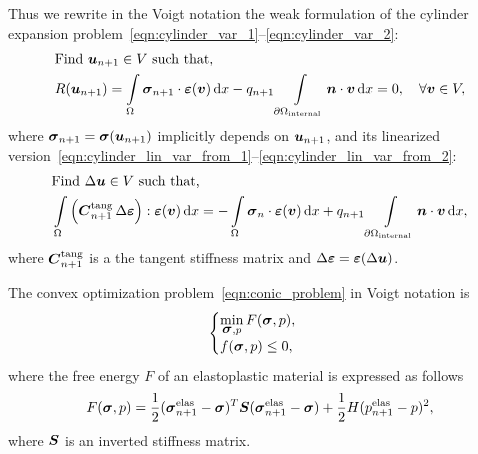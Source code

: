 \documentclass[12pt]{article}
\begin{document}
Thus we rewrite in the Voigt notation the weak formulation of the cylinder expansion problem~\ref{eqn:cylinder_var_1}--\ref{eqn:cylinder_var_2}:
\begin{align}
    & \text{Find } \mbox{\boldmath $u$}_{n+1} \in V \text{ such that,} \label{eqn:var_disc_from_1_voigt} \\ 
    & R(\mbox{\boldmath $u$}_{n+1}) = \int\limits_\Omega\mbox{\boldmath$\sigma$}_{n+1} \cdot \mbox{\boldmath $\varepsilon$}(\mbox{\boldmath $v$}) \, \mathrm{d} x - q_{n+1}\int\limits_{\partial\Omega_\text{internal}}\mbox{\boldmath $n$} \cdot \mbox{\boldmath $v$} \, \mathrm{d} x = 0, \quad \forall \mbox{\boldmath $v$} \in V \label{eqn:var_disc_from_2_voigt},
\end{align}
where $\mbox{\boldmath$\sigma$}_{n+1} = \mbox{\boldmath$\sigma$}(\mbox{\boldmath $u$}_{n+1})$ implicitly depends on $\mbox{\boldmath $u$}_{n+1}$, and its linearized version~\ref{eqn:cylinder_lin_var_from_1}--\ref{eqn:cylinder_lin_var_from_2}:
\begin{align}
    & \text{Find } \Delta\mbox{\boldmath $u$} \in V \text{ such that,} \label{eqn:cylinder_lin_var_1_voigt} \\ 
    & \int\limits_\Omega \left(\mbox{\boldmath $C$}_{n+1}^\text{tang} \, \Delta\mbox{\boldmath $\varepsilon$}\right) : \mbox{\boldmath $\varepsilon$}(\mbox{\boldmath $v$}) \, \mathrm{d} x = -\int\limits_\Omega\mbox{\boldmath$\sigma$}_n \cdot \mbox{\boldmath $\varepsilon$}(\mbox{\boldmath $v$}) \, \mathrm{d} x + q_{n+1}\int\limits_{\partial\Omega_\text{internal}}\mbox{\boldmath $n$} \cdot \mbox{\boldmath $v$} \, \mathrm{d} x \label{eqn:cylinder_lin_var_2_voigt},
\end{align}
where $\mbox{\boldmath $C$}_{n+1}^{\text{tang}}$ is a the tangent stiffness matrix and $\Delta\mbox{\boldmath $\varepsilon$} = \mbox{\boldmath $\varepsilon$}(\Delta\mbox{\boldmath $u$})$.



The convex optimization problem~\ref{eqn:conic_problem} in Voigt notation is
\begin{equation}
    \label{eqn:conic_problem_Voigt}
    \begin{cases}
        \min\limits_{\mbox{\boldmath$\sigma$}, p} F(\mbox{\boldmath$\sigma$}, p), \\
        f(\mbox{\boldmath$\sigma$}, p) \leq 0,
    \end{cases}
\end{equation}
where the free energy $F$ of an elastoplastic material is expressed as follows
\begin{equation}
    F(\mbox{\boldmath$\sigma$}, p) = \frac{1}{2}(\mbox{\boldmath$\sigma$}_{n+1}^\text{elas} - \mbox{\boldmath$\sigma$})^T \mbox{\boldmath $S$} (\mbox{\boldmath$\sigma$}_{n+1}^\text{elas} - \mbox{\boldmath$\sigma$}) + \frac{1}{2}H(p_{n+1}^\text{elas} - p)^2,
\end{equation}
where $\mbox{\boldmath $S$}$ is an inverted stiffness matrix.
\end{document}
